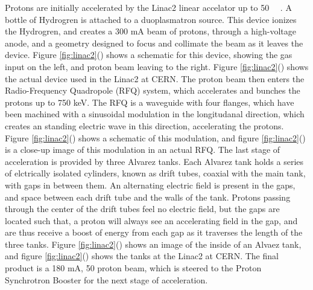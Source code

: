 \par Protons are initially accelerated by the Linac2 linear accelator
up to 50
\MeV~\cite{LHC:TDR_Vol3_InjectionChain_Benedikt}~\cite{LHC:LHIC_linac2_lhcTests_Hill}.
A bottle of Hydrogren is attached to a duoplasmatron source.  This
device ionizes the Hydrogren, and creates a 300 mA beam of protons,
through a high-voltage anode, and a geometry designed to focus and
collimate the beam as it leaves the device.  Figure
\ref{fig:linac2}() shows a
schematic for this device, showing the gas input on the left, and
proton beam leaving to the right.  Figure
\ref{fig:linac2}() shows the actual
device used in the Linac2 at CERN.  The proton beam then enters the
Radio-Frequency Quadropole (RFQ) system, which accelerates and bunches
the protons up to 750 keV.  The RFQ is a waveguide with four flanges,
which have been machined with a sinusoidal modulation in the
longitudanal direction, which creates an standing electric wave in
this direction, accelerating the protons.  Figure
\ref{fig:linac2}() shows a schematic of this
modulation, and figure \ref{fig:linac2}() is a
close-up image of this modulation in an actual RFQ. The last stage of
acceleration is provided by three Alvarez tanks.  Each Alvarez tank
holds a series of elctrically isolated cylinders, known as drift
tubes, coaxial with the main tank, with gaps in between them. An
alternating electric field is present in the gaps, and space between
each drift tube and the walls of the tank.  Protons passing through
the center of the drift tubes feel no electric field, but the gaps are
located such that, a proton will always see an accelerating field in
the gap, and are thus receive a boost of energy from each gap as it
traverses the length of the three tanks.  Figure
\ref{fig:linac2}() shows an image of
the inside of an Alvaez tank, and figure
\ref{fig:linac2}() shows the tanks at
the Linac2 at CERN.  The final product is a 180 mA, 50 \MeV proton
beam, which is steered to the Proton Synchrotron Booster for the next
stage of acceleration.

